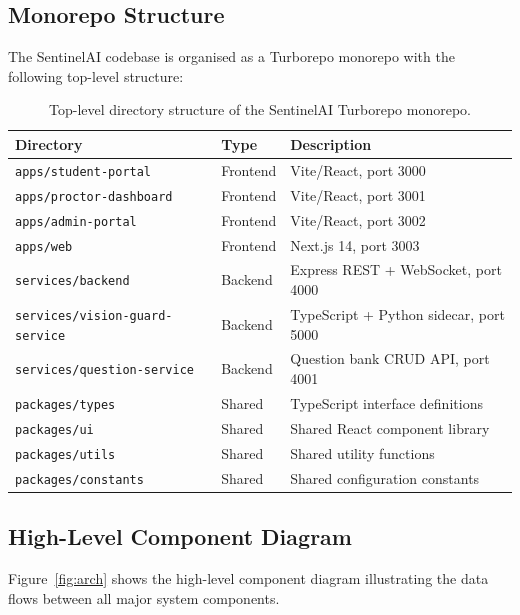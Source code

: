 \subsection{Monorepo Structure}

The SentinelAI codebase is organised as a Turborepo monorepo with the following top-level structure:

\begin{table}[h]
    \centering
    \caption{Top-level directory structure of the SentinelAI Turborepo monorepo.}
    \begin{tabular}{@{}lll@{}}
        \toprule
        Directory & Type & Description \\
        \midrule
        \texttt{apps/student-portal}    & Frontend & Vite/React, port 3000 \\
        \texttt{apps/proctor-dashboard} & Frontend & Vite/React, port 3001 \\
        \texttt{apps/admin-portal}      & Frontend & Vite/React, port 3002 \\
        \texttt{apps/web}               & Frontend & Next.js 14, port 3003 \\
        \texttt{services/backend}       & Backend  & Express REST + WebSocket, port 4000 \\
        \texttt{services/vision-guard-service} & Backend & TypeScript + Python sidecar, port 5000 \\
        \texttt{services/question-service}     & Backend & Question bank CRUD API, port 4001 \\
        \texttt{packages/types}         & Shared   & TypeScript interface definitions \\
        \texttt{packages/ui}            & Shared   & Shared React component library \\
        \texttt{packages/utils}         & Shared   & Shared utility functions \\
        \texttt{packages/constants}     & Shared   & Shared configuration constants \\
        \bottomrule
    \end{tabular}
    \label{tab:monorepo}
\end{table}

\subsection{High-Level Component Diagram}

Figure~\ref{fig:arch} shows the high-level component diagram illustrating the data flows between all major system components.

